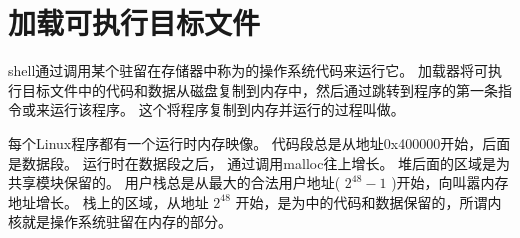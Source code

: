 
\section{加载可执行目标文件}
{
    shell通过调用某个驻留在存储器中称为的操作系统代码来运行它。
    加载器将可执行目标文件中的代码和数据从磁盘复制到内存中，然后通过跳转到程序的第一条指令或来运行该程序。
    这个将程序复制到内存并运行的过程叫做。

    每个Linux程序都有一个运行时内存映像。
    代码段总是从地址0x400000开始，后面是数据段。
    运行时在数据段之后，
    通过调用malloc往上增长。
    堆后面的区域是为共享模块保留的。
    用户栈总是从最大的合法用户地址( $2^48 - 1$ )开始，向叫嚣内存地址增长。
    栈上的区域，从地址 $2^48$ 开始，是为中的代码和数据保留的，所谓内核就是操作系统驻留在内存的部分。
}
